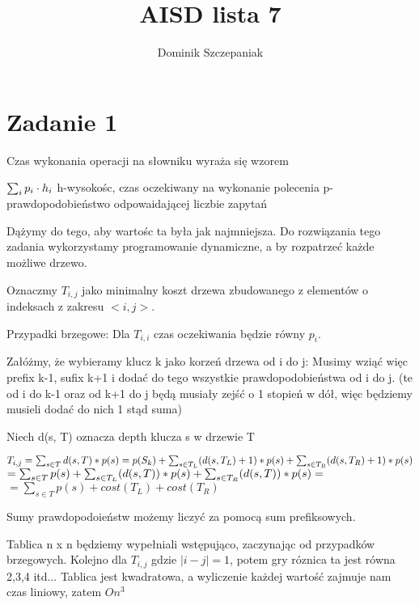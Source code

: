 \documentclass[12pt]{article}
\title{AISD lista 7}
\author{Dominik Szczepaniak}
\begin{document}
\maketitle

\bgroup\obeylines

\section{Zadanie 1}
Czas wykonania operacji na słowniku wyraża się wzorem

$\sum_i p_i \cdot h_i\\$
h-wysokośc, czas oczekiwany na wykonanie polecenia
p-prawdopodobieństwo odpowaidającej liczbie zapytań

Dążymy do tego, aby wartośc ta była jak najmniejsza. Do rozwiązania tego zadania wykorzystamy programowanie dynamiczne, a by rozpatrzeć każde możliwe drzewo.

Oznaczmy $T_{i,j}$ jako minimalny koszt drzewa zbudowanego z elementów o indeksach z zakresu $<i,j>$.

Przypadki brzegowe: Dla $T_{i,i}$ czas oczekiwania będzie równy $p_i$.

Załóżmy, że wybieramy klucz k jako korzeń drzewa od i do j:
Musimy wziąć więc prefix k-1, sufix k+1 i dodać do tego wszystkie prawdopodobieństwa od i do j. (te od i do k-1 oraz od k+1 do j będą musiały zejść o 1 stopień w dół, więc będziemy musieli dodać do nich 1 stąd suma)

Niech d(s, T) oznacza depth klucza s w drzewie T 

$T_{i, j} = \sum_{s \in T} d(s, T) * p(s) = p(S_k) + \sum_{s \in T_L} (d(s, T_L) + 1) * p(s) + \sum_{s \in T_R}(d(s, T_R)+1) * p(s)\\$
$= \sum_{s \in T} p(s) + \sum_{s \in T_L} (d(s, T)) * p(s) + \sum_{s \in T_R} (d(s, T)) * p(s) = \\$
$=\sum_{s \in T} p(s) + cost(T_L) + cost(T_R)$



Sumy prawdopodoieństw możemy liczyć za pomocą sum prefiksowych.

Tablica n x n będziemy wypełniali wstępująco, zaczynając od przypadków brzegowych. Kolejno dla $T_{i, j}$ gdzie $|i-j| = 1$, potem gry róznica ta jest równa 2,3,4 itd...
Tablica jest kwadratowa, a wyliczenie każdej wartość zajmuje nam czas liniowy, zatem $O{n^3}$
\end{document}
